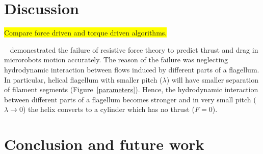 \documentclass[12pt,a4paper,titlepage]{report}
\newcommand{\hilight}[1]{\colorbox{yellow}{#1}}
\begin{document}
\chapter{Discussion}

 \hilight{Compare force driven and torque driven algorithms.}


\citeauthor{rodenborn2013propulsion}~\citep{rodenborn2013propulsion} demonestrated the failure of resistive force
 theory to predict thrust and drag in microrobots motion accurately. The reason of the failure was neglecting hydrodynamic
interaction between flows induced by different parts of a flagellum. In particular, helical flagellum with
 smaller pitch ($\lambda$) will have smaller separation of filament segments (Figure~\ref{parameters}). Hence,
 the hydrodynamic interaction between different parts of a flagellum becomes stronger and in very small
pitch ($\lambda \to 0$) the helix converts to a cylinder which has no thrust ($F= 0$).

\chapter{Conclusion and future work}



\nocite{lauga2006swimming}




\renewcommand{\bibname}{References}

 
\end{document}
